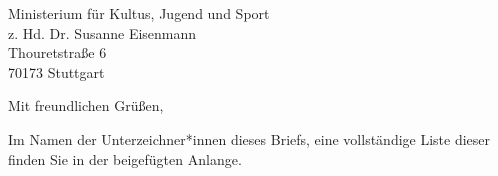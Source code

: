 \documentclass[
	fontsize=12pt,
	parskip=full,
	paper=A4,	
	fromalign=right,
	fromemail=true,
	version=last,
]{scrlttr2}
\begin{document}
\begin{letter}{
	Ministerium für Kultus, Jugend und Sport\\
	z. Hd. Dr. Susanne Eisenmann\\
	Thouretstraße 6\\
	70173 Stuttgart 
}
\closing{Mit freundlichen Grüßen,}
Im Namen der Unterzeichner*innen dieses Briefs, eine vollständige Liste dieser finden Sie in der beigefügten Anlange.


\end{letter}
\end{document}
